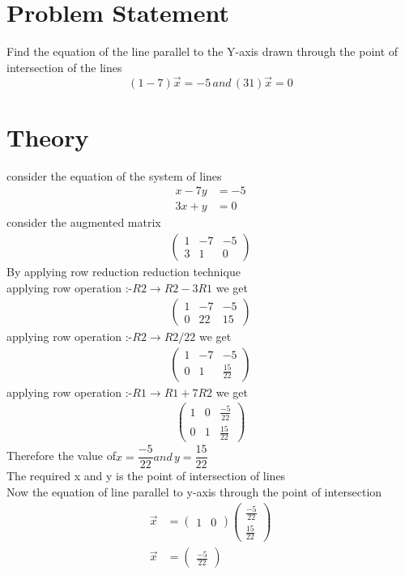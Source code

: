 \documentclass{article}
\newcommand{\myvec}[1]{\ensuremath{\begin{pmatrix}#1\end{pmatrix}}}
\begin{document}
\section{Problem Statement}
Find the equation of the line parallel to the Y-axis drawn through the point of intersection of the lines
\[
(1 -7)\vec{x}=-5 \, and \, (3 1)\vec{x}=0
\]
\section{Theory}
consider the equation of the system of lines
\begin{align}
x - 7y & = -5 \\
3x + y & = 0
\end{align}
 consider the augmented matrix
 \begin{align}
 \myvec{1 & -7 & -5 \\ 3 & 1 & 0}
 \end{align}
 By applying row reduction reduction technique \\
 applying row operation :-$ R2 \xrightarrow{} R2-3R1$ we get \\
 \begin{align}
 \myvec{1 & -7 & -5 \\ 0 & 22 & 15}
  \end{align}
 applying row operation :-$ R2 \xrightarrow{} R2/22$ we get \\
  \begin{align}
 \myvec{1 & -7 & -5 \\ 0 & 1 & \frac{15}{22}}
 \end{align}
 applying row operation :-$ R1 \xrightarrow{} R1+7R2 $ we get \\
 \begin{align}
 \myvec{1 & 0 & \frac{-5}{22} \\ 0 & 1 & \frac{15}{22}}
 \end{align}
 Therefore the value of$ x = \dfrac{-5}{22} and\, y = \dfrac{15}{22}$ \\
 The required x and y is the point of intersection of lines\\ 
 Now the equation of line parallel to y-axis through the point of intersection\\
 \begin{align}
\vec{x} & = \myvec{1 & 0  }\myvec{ \frac{-5}{22}\\ \frac{15}{22}}\\
\vec{x} & = \myvec{\frac{-5}{22}}
 \end{align}
 
 
 
 
 
 
 
 
 
\end{document}
